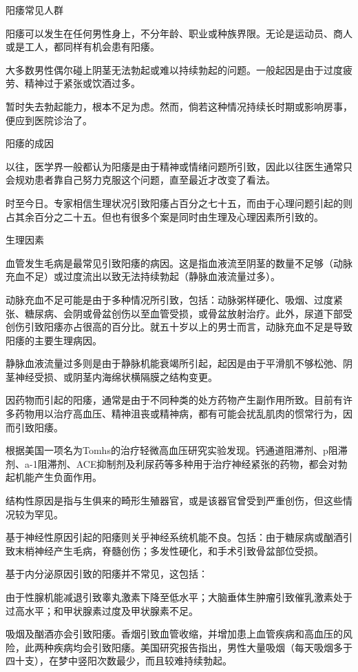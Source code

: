 \documentclass[12pt,UTF8,openany]{ctexbook}
\begin{document}
阳痿常见人群


阳痿可以发生在任何男性身上，不分年龄、职业或种族界限。无论是运动员、商人或是工人，都同样有机会患有阳痿。

大多数男性偶尔碰上阴茎无法勃起或难以持续勃起的问题。一般起因是由于过度疲劳、精神过于紧张或饮酒过多。

暂时失去勃起能力，根本不足为虑。然而，倘若这种情况持续长时期或影响房事，便应到医院诊治了。





阳痿的成因


以往，医学界一般都认为阳痿是由于精神或情绪问题所引致，因此以往医生通常只会规劝患者靠自己努力克服这个问题，直至最近才改变了看法。

时至今日。专家相信生理状况引致阳痿占百分之七十五，而由于心理问题引起的则占其余百分之二十五。但也有很多个案是同时由生理及心理因素所引致的。

生理因素

血管发生毛病是最常见引致阳痿的病因。这是指血液流至阴茎的数量不足够（动脉充血不足）或过度流出以致无法持续勃起（静脉血液流量过多）。

动脉充血不足可能是由于多种情况所引致，包括：动脉粥样硬化、吸烟、过度紧张、糖尿病、会阴或骨盆创伤以至血管受损，或骨盆放射治疗。此外，尿道下部受创伤引致阳痿亦占很高的百分比。就五十岁以上的男士而言，动脉充血不足是导致阳痿的主要生理病因。

静脉血液流量过多则是由于静脉机能衰竭所引起，起因是由于平滑肌不够松弛、阴茎神经受损、或阴茎内海绵状横隔膜之结构变更。

因药物而引起的阳痿，通常是由于不同种类的处方药物产生副作用所致。目前有许多药物用以治疗高血压、精神沮丧或精神病，都有可能会扰乱肌肉的惯常行为，因而引致阳痿。

根据美国一项名为Tomhs的治疗轻微高血压研究实验发现。钙通道阻滞剂、p阻滞剂、a-1阻滞剂、ACE抑制剂及利尿药等多种用于治疗神经紧张的药物，都会对勃起机能产生负面作用。

结构性原因是指与生俱来的畸形生殖器官，或是该器官曾受到严重创伤，但这些情况较为罕见。

基于神经性原因引起的阳痿则关乎神经系统机能不良。包括：由于糖尿病或酗酒引致末梢神经产生毛病，脊髓创伤；多发性硬化，和手术引致骨盆部位受损。

基于内分泌原因引致的阳痿并不常见，这包括：

由于性腺机能减退引致睾丸激素下降至低水平；大脑垂体生肿瘤引致催乳激素处于过高水平；和甲状腺素过度及甲状腺素不足。

吸烟及酗酒亦会引致阳痿。香烟引致血管收缩，并增加患上血管疾病和高血压的风险，此两种疾病均会引致阳痿。美国研究报告指出，男性大量吸烟（每天吸烟多于四十支），在梦中竖阳次数最少，而且较难持续勃起。
\end{document}
